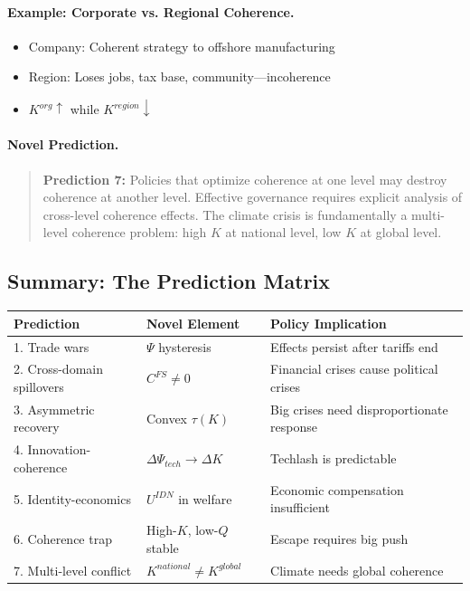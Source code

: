 \documentclass[12pt,a4paper]{article}
\begin{document}
\paragraph{Example: Corporate vs. Regional Coherence.}
\begin{itemize}
  \item Company: Coherent strategy to offshore manufacturing
  \item Region: Loses jobs, tax base, community---incoherence
  \item $K^{org} \uparrow$ while $K^{region} \downarrow$
\end{itemize}

\paragraph{Novel Prediction.}
\begin{quote}
\textbf{Prediction 7:} Policies that optimize coherence at one level
may destroy coherence at another level. Effective governance requires
explicit analysis of cross-level coherence effects.
The climate crisis \citep{weitzman2009} is fundamentally a multi-level coherence problem:
high $K$ at national level, low $K$ at global level.
\end{quote}

\subsection{Summary: The Prediction Matrix}

\begin{center}
\renewcommand{\arraystretch}{1.3}
\begin{tabular}{lll}
\hline
\textbf{Prediction} & \textbf{Novel Element} & \textbf{Policy Implication} \\
\hline
1. Trade wars & $\Psi$ hysteresis & Effects persist after tariffs end \\
2. Cross-domain spillovers & $C^{FS} \neq 0$ & Financial crises cause political crises \\
3. Asymmetric recovery & Convex $\tau(K)$ & Big crises need disproportionate response \\
4. Innovation-coherence & $\Delta \Psi_{tech} \to \Delta K$ & Techlash is predictable \\
5. Identity-economics & $U^{IDN}$ in welfare & Economic compensation insufficient \\
6. Coherence trap & High-$K$, low-$Q$ stable & Escape requires big push \\
7. Multi-level conflict & $K^{national} \neq K^{global}$ & Climate needs global coherence \\
\hline
\end{tabular}
\end{center}
\end{document}
